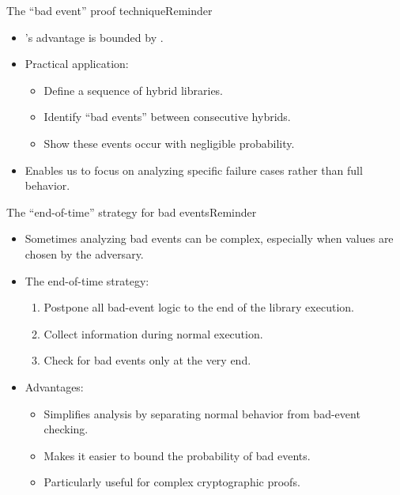 \ifdefined\PRESENTATION\else\PassOptionsToClass{handout}{beamer}\fi\documentclass[aspectratio=169, lualatex]{beamer}
\begin{document}
	\begin{frame}{The ``bad event'' proof technique}{Reminder}
		\begin{itemize}
			\item \prog{}'s advantage is bounded by .
			\item Practical application:
			      \begin{itemize}
				      \item Define a sequence of hybrid libraries.
				      \item Identify ``bad events'' between consecutive hybrids.
				      \item Show these events occur with negligible probability.
			      \end{itemize}
			\item Enables us to focus on analyzing specific failure cases rather than full behavior.
		\end{itemize}
	\end{frame}

	\begin{frame}{The ``end-of-time'' strategy for bad events}{Reminder}
		\begin{itemize}
			\item Sometimes analyzing bad events can be complex, especially when values are chosen by the adversary.
			\item The end-of-time strategy:
			      \begin{enumerate}
				      \item Postpone all bad-event logic to the end of the library execution.
				      \item Collect information during normal execution.
				      \item Check for bad events only at the very end.
			      \end{enumerate}
			\item Advantages:
			      \begin{itemize}
				      \item Simplifies analysis by separating normal behavior from bad-event checking.
				      \item Makes it easier to bound the probability of bad events.
				      \item Particularly useful for complex cryptographic proofs.
			      \end{itemize}
		\end{itemize}
	\end{frame}
\end{document}
